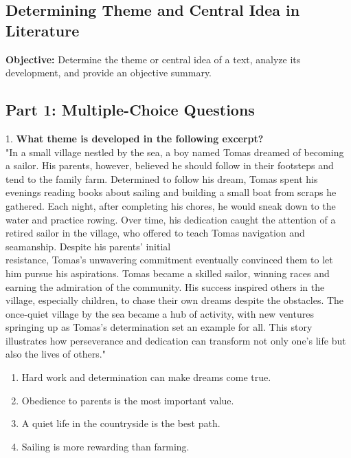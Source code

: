 \documentclass[12pt]{article}
\begin{document}
\subsection*{Determining Theme and Central Idea in Literature}
\onehalfspacing

\begin{tcolorbox}[colframe=black!40, colback=gray!0, title=Learning Objective]
\textbf{Objective:} Determine the theme or central idea of a text, analyze its development, and provide an objective summary.
\end{tcolorbox}

\subsection*{Part 1: Multiple-Choice Questions}

1. \textbf{What theme is developed in the following excerpt?}\\
"In a small village nestled by the sea, a boy named Tomas dreamed of becoming a sailor. His parents, however, believed he should follow in their footsteps and tend to the family farm. Determined to follow his dream, Tomas spent his evenings reading books about sailing and building a small boat from scraps he gathered. Each night, after completing his chores, he would sneak down to the water and practice rowing. Over time, his dedication caught the attention of a retired sailor in the village, who offered to teach Tomas navigation and seamanship. Despite his parents' initial \\resistance, Tomas’s unwavering commitment eventually convinced them to let him pursue his aspirations. Tomas became a skilled sailor, winning races and earning the admiration of the community. His success inspired others in the village, especially children, to chase their own dreams despite the obstacles. The once-quiet village by the sea became a hub of activity, with new ventures springing up as Tomas’s determination set an example for all. This story illustrates how perseverance and dedication can transform not only one’s life but also the lives of others."  
\begin{enumerate}[label=\Alph*.]
    \item Hard work and determination can make dreams come true.  
    \item Obedience to parents is the most important value.  
    \item A quiet life in the countryside is the best path.  
    \item Sailing is more rewarding than farming.  
\end{enumerate}
\end{document}
